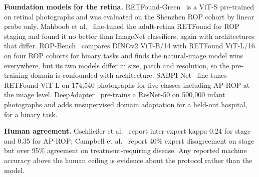 \textbf{Foundation models for the retina.} RETFound-Green~\cite{engelmann2025} is a ViT-S pre-trained on retinal photographs and was evaluated on the Shenzhen ROP cohort by linear probe only. Mahboob et al.~\cite{mahboob2025} fine-tuned the adult-retina RETFound for ROP staging and found it no better than ImageNet classifiers, again with architectures that differ. ROP-Bench~\cite{luo2026} compares DINOv2 ViT-B/14 with RETFound ViT-L/16 on four ROP cohorts for binary tasks and finds the natural-image model wins everywhere, but its two models differ in size, patch and resolution, so the pre-training domain is confounded with architecture. SABPI-Net~\cite{chen2025} fine-tunes RETFound ViT-L on 174{,}540 photographs for five classes including AP-ROP at the image level. DeepAdapter~\cite{zhao2026} pre-trains a ResNet-50 on 500{,}000 infant photographs and adds unsupervised domain adaptation for a held-out hospital, for a binary task.

\textbf{Human agreement.} Gschlie\ss{}er et al.~\cite{gschliesser2015} report inter-expert kappa 0.24 for stage and 0.35 for AP-ROP; Campbell et al.~\cite{campbell2016} report 40\% expert disagreement on stage but over 95\% agreement on treatment-requiring disease. Any reported machine accuracy above the human ceiling is evidence about the protocol rather than the model.

